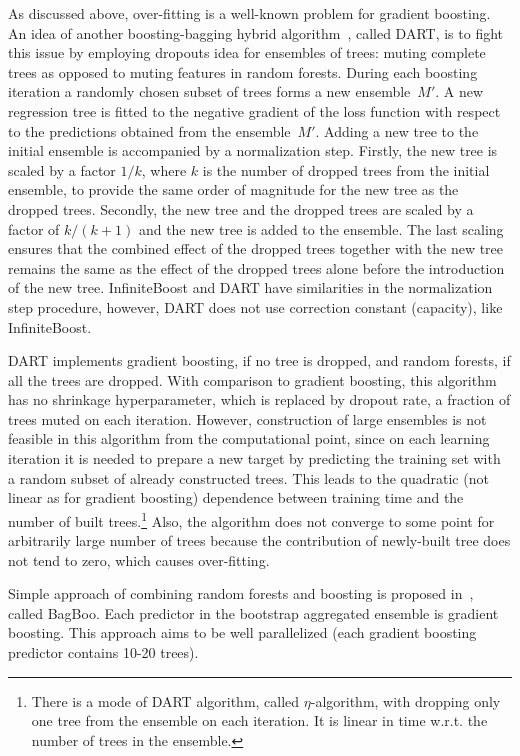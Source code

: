 As discussed above, over-fitting is a well-known problem for gradient boosting. 
An idea of another boosting-bagging hybrid algorithm~\cite{key-dart}, called DART, is to fight this issue by employing dropouts idea for ensembles of trees: muting complete trees as opposed to muting features in random forests. 
During each boosting iteration a randomly chosen subset of trees forms a new ensemble~$M'$. 
A new regression tree is fitted to the negative gradient of the loss function with respect to the predictions obtained from the ensemble~$M'$.
Adding a new tree to the initial ensemble is accompanied by a normalization step.
Firstly, the new tree is scaled by a factor $1/k$, where $k$ is the number of dropped trees from the initial ensemble, to provide the same order of magnitude for the new tree as the dropped trees. 
Secondly, the new tree and the dropped trees are scaled by a factor of $k/(k+1)$ and the new tree is added to the ensemble.
The last scaling ensures that the combined effect of the dropped trees together with the new tree remains the
same as the effect of the dropped trees alone before the introduction of the new tree.
InfiniteBoost and DART have similarities in the normalization step procedure, however, DART does not use correction constant (capacity), like InfiniteBoost.

DART implements gradient boosting, if no tree is dropped, and random forests, if all the trees are dropped.
With comparison to gradient boosting, this algorithm has no shrinkage hyperparameter, which is replaced by dropout rate, a fraction of trees muted on each iteration.
However, construction of large ensembles is not feasible in this algorithm from the computational point,
since on each learning iteration it is needed to prepare a new target by predicting the training set with a random subset of already constructed trees.
This leads to the quadratic (not linear as for gradient boosting) dependence between training time and the number of built trees.\footnote{
There is a mode of DART algorithm, called $\eta$-algorithm, with dropping only one tree from the ensemble on each iteration.
It is linear in time w.r.t. the number of trees in the ensemble.}
Also, the algorithm does not converge to some point for arbitrarily large number of trees because the contribution of newly-built tree does not tend to zero, which causes over-fitting.

Simple approach of combining random forests and boosting is proposed in~\cite{key-bagboo}, called BagBoo. 
Each predictor in the bootstrap aggregated ensemble is gradient boosting. 
This approach aims to be well parallelized (each gradient boosting predictor contains 10-20 trees).


